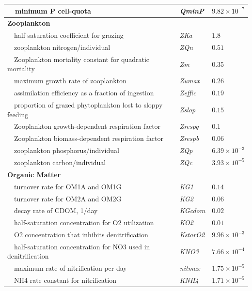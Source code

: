 \documentclass[letterpaper,12pt,oneside]{article}\usepackage[]{graphicx}\usepackage[]{color}
\begin{document}
\begin{table}[!tbp]
{\begin{center}
\begin{tabular}{lll}
~~minimum P cell-quota&\textit{QminP}&$9.82\times 10^{-7}$\tabularnewline
\hline
{\bfseries Zooplankton}&&\tabularnewline
~~half saturation coefficient for grazing&\textit{ZKa}&$1.8$\tabularnewline
~~zooplankton nitrogen/individual&\textit{ZQn}&$0.51$\tabularnewline
~~Zooplankton mortality constant for quadratic mortality&\textit{Zm}&$0.35$\tabularnewline
~~maximum growth rate of zooplankton&\textit{Zumax}&$0.26$\tabularnewline
~~assimilation efficiency as a fraction of ingestion&\textit{Zeffic}&$0.19$\tabularnewline
~~proportion of grazed phytoplankton lost to sloppy feeding&\textit{Zslop}&$0.15$\tabularnewline
~~Zooplankton growth-dependent respiration factor&\textit{Zrespg}&$0.1$\tabularnewline
~~Zooplankton biomass-dependent respiration factor&\textit{Zrespb}&$0.06$\tabularnewline
~~zooplankton phosphorus/individual&\textit{ZQp}&$6.39\times 10^{-3}$\tabularnewline
~~zooplankton carbon/individual&\textit{ZQc}&$3.93\times 10^{-5}$\tabularnewline
\hline
{\bfseries Organic Matter}&&\tabularnewline
~~turnover rate for OM1A and OM1G&\textit{KG1}&$0.14$\tabularnewline
~~turnover rate for OM2A and OM2G&\textit{KG2}&$0.06$\tabularnewline
~~decay rate of CDOM, 1/day&\textit{KGcdom}&$0.02$\tabularnewline
~~half-saturation concentration for O2 utilization&\textit{KO2}&$0.01$\tabularnewline
~~O2 concentration that inhibits denitrification&\textit{KstarO2}&$9.96\times 10^{-3}$\tabularnewline
~~half-saturation concentration for NO3 used in denitrification&\textit{KNO3}&$7.66\times 10^{-4}$\tabularnewline
~~maximum rate of nitrification per day&\textit{nitmax}&$1.75\times 10^{-5}$\tabularnewline
~~NH4 rate constant for nitrification&\textit{KNH4}&$1.71\times 10^{-5}$\tabularnewline
\hline
\end{tabular}\end{center}}

\end{table}



\end{document}
